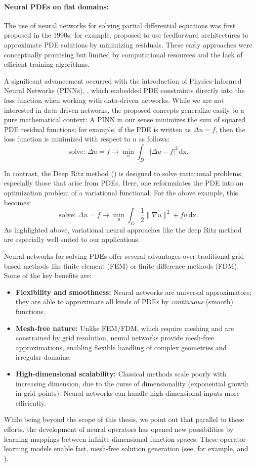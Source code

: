 \documentclass[draft,12pt,openany]{book}
\theoremstyle{plainnormal}
\theoremstyle{remark}
\begin{document}
\paragraph{Neural PDEs on flat domains:}
The use of neural networks for solving partial differential equations was first proposed in the 1990s; for example, \cite{Lagaris_1998} proposed to use feedforward architectures to approximate PDE solutions by minimizing residuals. These early approaches were conceptually promising but limited by computational resources and the lack of efficient training algorithms. \par
A significant advancement occurred with the introduction of Physics-Informed Neural Networks (PINNs), \cite{RAISSI2019686}, which embedded PDE constraints directly into the loss function when working with data-driven networks. While we are not interested in data-driven networks, the proposed concepts generalize easily to a pure mathematical context: A PINN in our sense minimizes the sum of squared PDE residual functions; for example, if the PDE is written as $\Delta u = f$, then the loss function is minimized with respect to u as follows:  $$ \text{solve: }\Delta u = f \rightarrow \min_u \int_D|\Delta u - f| ^2 \,\mathrm{dx}.$$
\par
In contrast, the Deep Ritz method (\cite{deepritzmethoddeep}) is designed to solve variational problems, especially those that arise from PDEs. Here, one reformulates the PDE into an optimization problem of a variational functional. For the above example, this becomes: $$\text{solve: } \Delta u = f \rightarrow \min_u \int_D \frac{1}{2}\|\nabla u\|^2 + fu \,\mathrm{dx}.$$
As highlighted above, variational neural approaches like the deep Ritz method are especially well suited to our applications.
\par
Neural networks for solving PDEs offer several advantages over traditional grid-based methods like finite element (FEM) or finite difference methods (FDM). Some of the key benefits are: \begin{itemize}
\item \textbf{Flexibility and smoothness:}
Neural networks are universal approximators; they are able to approximate all kinds of PDEs by \emph{continuous} (smooth) functions. 
\item\textbf{Mesh-free nature:} Unlike FEM/FDM, which require meshing and are constrained by grid resolution, neural networks provide mesh-free approximations, enabling flexible handling of complex geometries and irregular domains.
\item \textbf{High-dimensional scalability:} Classical methods scale poorly with increasing dimension, due to the curse of dimensionality (exponential growth in grid points). Neural networks can handle high-dimensional inputs more efficiently.
\end{itemize}
While being beyond the scope of this thesis, we point out that parallel to these efforts, the development of neural operators has opened new possibilities by learning mappings between infinite-dimensional function spaces. These operator-learning models enable fast, mesh-free solution generation (see, for example, \cite{li2021fourierneuraloperatorparametric} and \cite{Lu_2021}).
\end{document}

